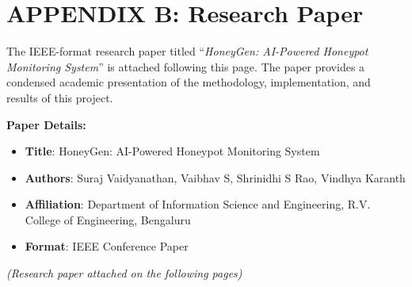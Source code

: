 \documentclass[12pt,a4paper]{report}
\begin{document}
\newpage

\chapter*{APPENDIX B: Research Paper}
\thispagestyle{plain}

The IEEE-format research paper titled ``\textit{HoneyGen: AI-Powered Honeypot Monitoring System}'' is attached following this page. The paper provides a condensed academic presentation of the methodology, implementation, and results of this project.

\vspace{1cm}

\textbf{Paper Details:}
\begin{itemize}
\item \textbf{Title}: HoneyGen: AI-Powered Honeypot Monitoring System
\item \textbf{Authors}: Suraj Vaidyanathan, Vaibhav S, Shrinidhi S Rao, Vindhya Karanth
\item \textbf{Affiliation}: Department of Information Science and Engineering, R.V. College of Engineering, Bengaluru
\item \textbf{Format}: IEEE Conference Paper
\end{itemize}

\vspace{1cm}

\textit{(Research paper attached on the following pages)}
\end{document}
